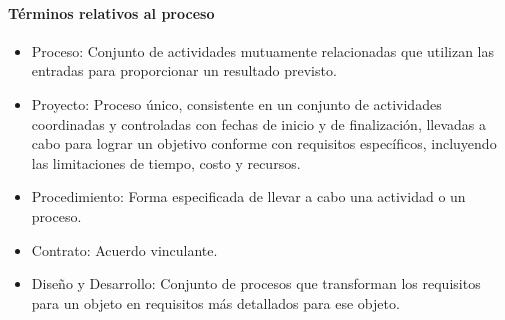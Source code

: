 					\newpage
					\thispagestyle{plain}
					\paragraph{Términos relativos al proceso}
						\begin{itemize}
							\item Proceso: Conjunto de actividades mutuamente relacionadas que utilizan las entradas para proporcionar un
							resultado previsto.
							
							\item Proyecto: Proceso único, consistente en un conjunto de actividades coordinadas y controladas con fechas
							de inicio y de finalización, llevadas a cabo para lograr un objetivo conforme con requisitos específicos, incluyendo las limitaciones de tiempo, costo y recursos.
							
							\item Procedimiento: Forma especificada de llevar a cabo una actividad o un proceso.
							
							\item Contrato: Acuerdo vinculante.
							
							\item Diseño y Desarrollo: Conjunto de procesos que transforman los requisitos para un objeto en requisitos más detallados para ese objeto.
						\end{itemize}
					
